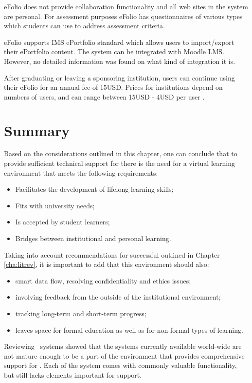 eFolio does not provide collaboration functionality and all web sites in the
system are personal. For assessment purposes eFolio has questionnaires of
various types which students can use to address assessment criteria.

eFolio supports IMS ePortfolio standard which allows users to import/export
their ePortfolio content. The system can be integrated with Moodle LMS. However,
no detailed information was found on what kind of integration it is.

After graduating or leaving a sponsoring institution, users can continue
using their eFolio for an annual fee of 15USD. Prices for institutions depend
on numbers of users, and can range between 15USD - 4USD per user
\citep{AAEEBL2011}.

\section{Summary}

Based on the considerations outlined in this chapter, one can conclude that to
provide sufficient technical support for \LLLs there is the need for a virtual
learning environment that meets the following requirements:

\begin{itemize}
	\item Facilitates the development of lifelong learning skills;
	\item Fits with university needs;
	\item Is accepted by student learners;
	\item Bridges between institutional and personal learning.
\end{itemize}

Taking into account recommendations for successful \LLLs outlined in Chapter
\ref{cha:litrev}, it is important to add that this environment should also:

\begin{itemize}
	\item smart data flow, resolving confidentiality and ethics issues;
	\item involving feedback from the outside of the institutional environment;
	\item tracking long-term and short-term progress;
	\item leaves space for formal education as well as for non-formal types of
	learning.
\end{itemize}

Reviewing \ep~systems showed that the systems currently available world-wide are
not mature enough to be a part of the environment that provides comprehensive
support for \LLLsn. Each of the system comes with commonly valuable
functionality, but still lacks elements important for \LLLs support.

